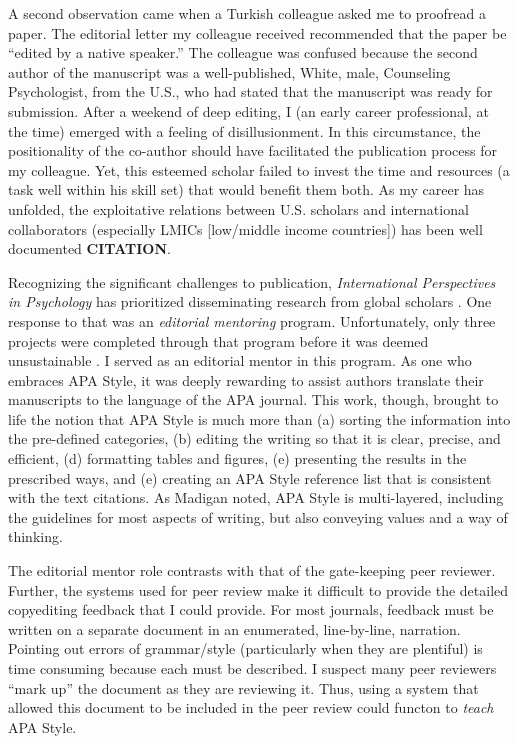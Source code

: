 \documentclass[
  11pt,
]{book}
\begin{document}
A second observation came when a Turkish colleague asked me to proofread a paper. The editorial letter my colleague received recommended that the paper be ``edited by a native speaker.'' The colleague was confused because the second author of the manuscript was a well-published, White, male, Counseling Psychologist, from the U.S., who had stated that the manuscript was ready for submission. After a weekend of deep editing, I (an early career professional, at the time) emerged with a feeling of disillusionment. In this circumstance, the positionality of the co-author should have facilitated the publication process for my colleague. Yet, this esteemed scholar failed to invest the time and resources (a task well within his skill set) that would benefit them both. As my career has unfolded, the exploitative relations between U.S. scholars and international collaborators (especially LMICs {[}low/middle income countries{]}) has been well documented \textbf{CITATION}.

Recognizing the significant challenges to publication, \emph{International Perspectives in Psychology} has prioritized disseminating research from global scholars \citep{gibbons_inaugural_2012}. One response to that was an \emph{editorial mentoring} program. Unfortunately, only three projects were completed through that program before it was deemed unsustainable \citep{gibbons_ippquo_2016}. I served as an editorial mentor in this program. As one who embraces APA Style, it was deeply rewarding to assist authors translate their manuscripts to the language of the APA journal. This work, though, brought to life the notion that APA Style is much more than (a) sorting the information into the pre-defined categories, (b) editing the writing so that it is clear, precise, and efficient, (d) formatting tables and figures, (e) presenting the results in the prescribed ways, and (e) creating an APA Style reference list that is consistent with the text citations. As Madigan \citep{madigan_language_1995} noted, APA Style is multi-layered, including the guidelines for most aspects of writing, but also conveying values and a way of thinking.

The editorial mentor role contrasts with that of the gate-keeping peer reviewer. Further, the systems used for peer review make it difficult to provide the detailed copyediting feedback that I could provide. For most journals, feedback must be written on a separate document in an enumerated, line-by-line, narration. Pointing out errors of grammar/style (particularly when they are plentiful) is time consuming because each must be described. I suspect many peer reviewers ``mark up'' the document as they are reviewing it. Thus, using a system that allowed this document to be included in the peer review could functon to \emph{teach} APA Style.
\end{document}
